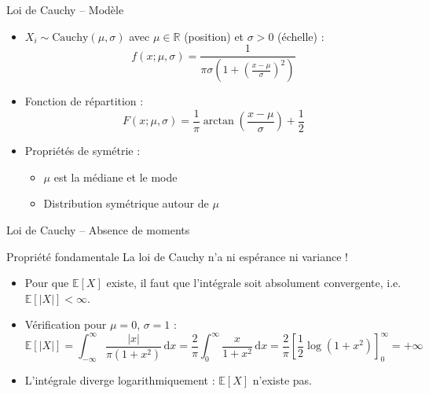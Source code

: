 \documentclass[11pt,aspectratio=169]{beamer}
\newcommand{\dd}{\mathrm{d}}
\begin{document}
\begin{frame}{Loi de Cauchy -- Modèle}

\begin{itemize}

\item $X_i \sim \text{Cauchy}(\mu, \sigma)$ avec $\mu \in \mathbb{R}$ (position) et $\sigma > 0$ (échelle) :
  \[
  f(x; \mu, \sigma) = \frac{1}{\pi\sigma\left(1 + \left(\frac{x-\mu}{\sigma}\right)^2\right)}
  \]

\item Fonction de répartition :
  \[
  F(x; \mu, \sigma) = \frac{1}{\pi}\arctan\left(\frac{x-\mu}{\sigma}\right) + \frac{1}{2}
  \]

\item Propriétés de symétrie :\newline
  \begin{itemize}
    \item $\mu$ est la médiane et le mode\newline
    \item Distribution symétrique autour de $\mu$
  \end{itemize}

\end{itemize}

\end{frame}

\begin{frame}{Loi de Cauchy -- Absence de moments}

\begin{alertblock}{Propriété fondamentale}
La loi de Cauchy n'a ni espérance ni variance !
\end{alertblock}

\bigskip

\begin{itemize}

\item Pour que $\mathbb{E}[X]$ existe, il faut que l'intégrale soit absolument convergente, i.e. $\mathbb{E}[|X|] < \infty$.\newline

\item Vérification pour $\mu = 0$, $\sigma = 1$ :
  \[
  \mathbb{E}[|X|] = \int_{-\infty}^{\infty} \frac{|x|}{\pi(1+x^2)} \, \dd x = \frac{2}{\pi} \int_0^{\infty} \frac{x}{1+x^2} \, \dd x = \frac{2}{\pi} \left[\frac{1}{2}\log(1+x^2)\right]_0^{\infty} = +\infty
  \]

\item L'intégrale diverge logarithmiquement : $\mathbb{E}[X]$ n'existe pas.

\end{itemize}

\end{frame}
\end{document}
